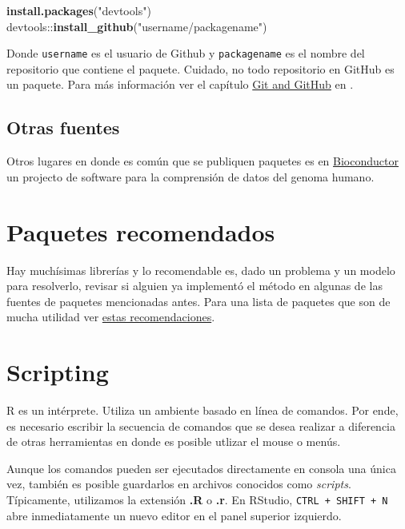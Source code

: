 \documentclass[]{article}
\newenvironment{Shaded}{\begin{snugshade}}{\end{snugshade}}
\newcommand{\KeywordTok}[1]{\textcolor[rgb]{0.13,0.29,0.53}{\textbf{{#1}}}}
\newcommand{\StringTok}[1]{\textcolor[rgb]{0.31,0.60,0.02}{{#1}}}
\newcommand{\NormalTok}[1]{{#1}}
\begin{document}
\begin{Shaded}
\begin{Highlighting}[]
\KeywordTok{install.packages}\NormalTok{(}\StringTok{"devtools"}\NormalTok{)}
\NormalTok{devtools::}\KeywordTok{install_github}\NormalTok{(}\StringTok{"username/packagename"}\NormalTok{)}
\end{Highlighting}
\end{Shaded}

Donde \texttt{username} es el usuario de Github y \texttt{packagename}
es el nombre del repositorio que contiene el paquete. Cuidado, no todo
repositorio en GitHub es un paquete. Para más información ver el
capítulo \href{http://r-pkgs.had.co.nz/git.html}{Git and GitHub} en
\textcite{wickham2015r}.

\subsection{Otras fuentes}\label{otras-fuentes}

Otros lugares en donde es común que se publiquen paquetes es en
\href{https://www.bioconductor.org/}{Bioconductor} un projecto de
software para la comprensión de datos del genoma humano.

\section{Paquetes recomendados}\label{paquetes-recomendados}

Hay muchísimas librerías y lo recomendable es, dado un problema y un
modelo para resolverlo, revisar si alguien ya implementó el método en
algunas de las fuentes de paquetes mencionadas antes. Para una lista de
paquetes que son de mucha utilidad ver
\href{https://github.com/Skalas/massive-adventure-ubuntu/blob/master/Rpackages/data_manipulation.R}{estas
recomendaciones}.

\section{Scripting}\label{scripting}

R es un intérprete. Utiliza un ambiente basado en línea de comandos. Por
ende, es necesario escribir la secuencia de comandos que se desea
realizar a diferencia de otras herramientas en donde es posible utlizar
el mouse o menús.

Aunque los comandos pueden ser ejecutados directamente en consola una
única vez, también es posible guardarlos en archivos conocidos como
\emph{scripts}. Típicamente, utilizamos la extensión \textbf{.R} o
\textbf{.r}. En RStudio, \texttt{CTRL + SHIFT + N} abre inmediatamente
un nuevo editor en el panel superior izquierdo.
\end{document}
